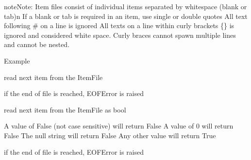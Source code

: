 \documentclass[letterpaper,10pt,english]{sphinxmanual}
\begin{document}
\begin{fulllineitems}
\begin{sphinxadmonition}{note}{Note:}
Item files consist of individual items separated by whitespace (blank or tab)\textbar{}n\textbar{}
If a blank or tab is required in an item, use single or double quotes 
All text following \# on a line is ignored 
All texts on a line within curly brackets \{\} is ignored and considered white space. 
Curly braces cannot spawn multiple lines and cannot be nested.

Example

\begin{sphinxVerbatim}[commandchars=\\\{\}]
      
   
\end{sphinxVerbatim}
\end{sphinxadmonition}

\begin{fulllineitems}
\label{\detokenize{Reference:salabim.ItemFile.read_item}}
read next item from the ItemFile

if the end of file is reached, EOFError is raised

\end{fulllineitems}


\begin{fulllineitems}
\label{\detokenize{Reference:salabim.ItemFile.read_item_bool}}
read next item from the ItemFile as bool

A value of False (not case sensitive) will return False 
A value of 0 will return False 
The null string will return False 
Any other value will return True

if the end of file is reached, EOFError is raised

\end{fulllineitems}



\end{fulllineitems}
\end{document}
